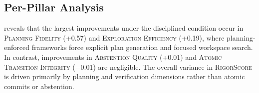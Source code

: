 \documentclass[letterpaper, 10 pt, conference]{ieeeconf}
\newcommand{\rigorscore}{\textsc{RigorScore}}
\newcommand{\pillar}[1]{\textsc{#1}}
\begin{document}
\subsection{Per-Pillar Analysis}

\begin{table}[t]
\centering
\caption{Per-pillar scores under Baseline ($\mathcal{B}$) and Disciplined ($\mathcal{D}$) conditions, averaged across all agents. $\mathcal{B}$ represents default agent execution, and $\mathcal{D}$ represents execution under the disciplined (Agent-Rigor) condition. Each pillar is scored on $[0, 1]$.}
\label{tab:perpillar}
\small
{}
\end{table}

 reveals that the largest improvements under the disciplined condition occur in \pillar{Planning Fidelity} (+0.57) and \pillar{Exploration Efficiency} (+0.19), where planning-enforced frameworks force explicit plan generation and focused workspace search. In contrast, improvements in \pillar{Abstention Quality} (+0.01) and \pillar{Atomic Transition Integrity} ($-$0.01) are negligible. The overall variance in \rigorscore{} is driven primarily by planning and verification dimensions rather than atomic commits or abstention.
\end{document}

